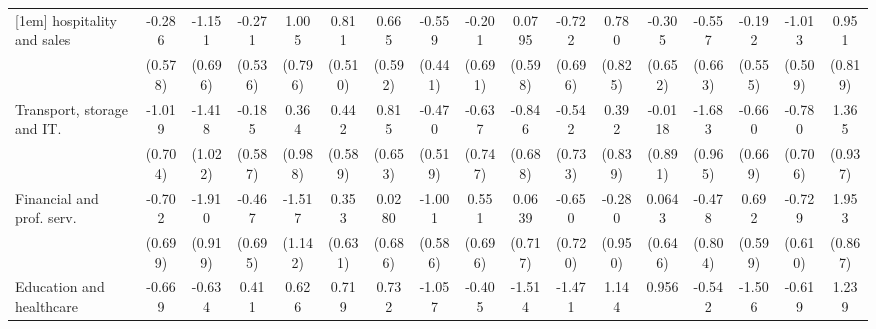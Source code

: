 {\begin{tabular}{l*{16}{c}}
[1em]
hospitality and sales&      -0.286         &      -1.151         &      -0.271         &       1.005         &       0.811         &       0.665         &      -0.559         &      -0.201         &      0.0795         &      -0.722         &       0.780         &      -0.305         &      -0.557         &      -0.192         &      -1.013\sym{*}  &       0.951         \\
                    &     (0.578)         &     (0.696)         &     (0.536)         &     (0.796)         &     (0.510)         &     (0.592)         &     (0.441)         &     (0.691)         &     (0.598)         &     (0.696)         &     (0.825)         &     (0.652)         &     (0.663)         &     (0.555)         &     (0.509)         &     (0.819)         \\
[1em]
Transport, storage and IT.&      -1.019         &      -1.418         &      -0.185         &       0.364         &       0.442         &       0.815         &      -0.470         &      -0.637         &      -0.846         &      -0.542         &       0.392         &     -0.0118         &      -1.683         &      -0.660         &      -0.780         &       1.365         \\
                    &     (0.704)         &     (1.022)         &     (0.587)         &     (0.988)         &     (0.589)         &     (0.653)         &     (0.519)         &     (0.747)         &     (0.688)         &     (0.733)         &     (0.839)         &     (0.891)         &     (0.965)         &     (0.669)         &     (0.706)         &     (0.937)         \\
[1em]
Financial and prof. serv.&      -0.702         &      -1.910\sym{*}  &      -0.467         &      -1.517         &       0.353         &      0.0280         &      -1.001         &       0.551         &      0.0639         &      -0.650         &      -0.280         &      0.0643         &      -0.478         &       0.692         &      -0.729         &       1.953\sym{*}  \\
                    &     (0.699)         &     (0.919)         &     (0.695)         &     (1.142)         &     (0.631)         &     (0.686)         &     (0.586)         &     (0.696)         &     (0.717)         &     (0.720)         &     (0.950)         &     (0.646)         &     (0.804)         &     (0.599)         &     (0.610)         &     (0.867)         \\
[1em]
Education and healthcare&      -0.669         &      -0.634         &       0.411         &       0.626         &       0.719         &       0.732         &      -1.057         &      -0.405         &      -1.514         &      -1.471         &       1.144         &       0.956         &      -0.542         &      -1.506         &      -0.619         &       1.239         \\

\end{tabular}}
